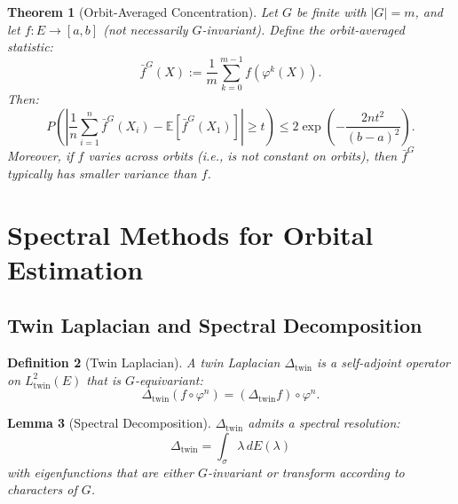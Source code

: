 \documentclass[11pt]{article}
\newtheorem{theorem}{Theorem}[section]
\newtheorem{lemma}[theorem]{Lemma}
\newtheorem{definition}[theorem]{Definition}
\newcommand{\E}{\mathbb{E}}
\begin{document}
\begin{theorem}[Orbit-Averaged Concentration]\label{thm:orbit_concentration}
Let $G$ be finite with $|G| = m$, and let $f : E \to [a, b]$ (not necessarily $G$-invariant). Define the orbit-averaged statistic:
\begin{equation}\label{eq:orbit_stat}
\bar{f}^G(X) := \frac{1}{m} \sum_{k=0}^{m-1} f(\varphi^k(X)).
\end{equation}
Then:
\begin{equation}\label{eq:orbit_concentration}
P\left( \left| \frac{1}{n} \sum_{i=1}^n \bar{f}^G(X_i) - \E[\bar{f}^G(X_1)] \right| \geq t \right) \leq 2 \exp\left( -\frac{2nt^2}{(b-a)^2} \right).
\end{equation}
Moreover, if $f$ varies across orbits (i.e., is not constant on orbits), then $\bar{f}^G$ typically has smaller variance than $f$.
\end{theorem}

\section{Spectral Methods for Orbital Estimation}
\label{sec:spectral}

\subsection{Twin Laplacian and Spectral Decomposition}

\begin{definition}[Twin Laplacian]\label{def:twin_laplacian}
A twin Laplacian $\Delta_{\mathrm{twin}}$ is a self-adjoint operator on $L^2_{\mathrm{twin}}(E)$ that is $G$-equivariant:
\begin{equation}\label{eq:twin_laplacian}
\Delta_{\mathrm{twin}}(f \circ \varphi^n) = (\Delta_{\mathrm{twin}} f) \circ \varphi^n.
\end{equation}
\end{definition}

\begin{lemma}[Spectral Decomposition]\label{lem:spectral}
$\Delta_{\mathrm{twin}}$ admits a spectral resolution:
\begin{equation}\label{eq:spectral_resolution}
\Delta_{\mathrm{twin}} = \int_\sigma \lambda \, dE(\lambda)
\end{equation}
with eigenfunctions that are either $G$-invariant or transform according to characters of $G$.
\end{lemma}
\end{document}
